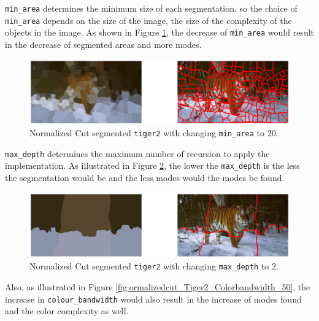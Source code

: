 \documentclass[11pt,a4paper]{article}
\begin{document}
\begin{itemize}
		\par \texttt{min\_area} determines the minimum size of each segmentation, so the choice of \texttt{min\_area} depends on the size of the image, the size of the complexity of the objects in the image. As shown in Figure \ref{fig:Normalizedcut_Tiger2_Minarea_20}, the decrease of \texttt{min\_area} would result in the decrease of segmented areas and more modes.

		\begin{figure}[!ht]
			\centering
			\includegraphics[width=\columnwidth]{Figure/Normalizedcut_Tiger2_Minarea_20.eps}
			\caption{Normalized Cut segmented \texttt{tiger2} with changing \texttt{min\_area} to $20$.}
			\label{fig:Normalizedcut_Tiger2_Minarea_20}
		\end{figure}

		\par \texttt{max\_depth} determines the maximum number of recursion to apply the implementation. As illustrated in Figure \ref{fig:Normalizedcut_Tiger2_Maxdepth_2}, the lower the \texttt{max\_depth} is the less the segmentation would be and the less modes would the modes be found.

		\begin{figure}[!ht]
			\centering
			\includegraphics[width=\columnwidth]{Figure/Normalizedcut_Tiger2_Maxdepth_2.eps}
			\caption{Normalized Cut segmented \texttt{tiger2} with changing \texttt{max\_depth} to $2$.}
			\label{fig:Normalizedcut_Tiger2_Maxdepth_2}
		\end{figure}

		\par Also, as illustrated in Figure \ref{fig:ormalizedcut_Tiger2_Colorbandwidth_50}, the increase in \texttt{colour\_bandwidth} would also result in the increase of modes found and the color complexity as well.


\end{itemize}
\end{document}
